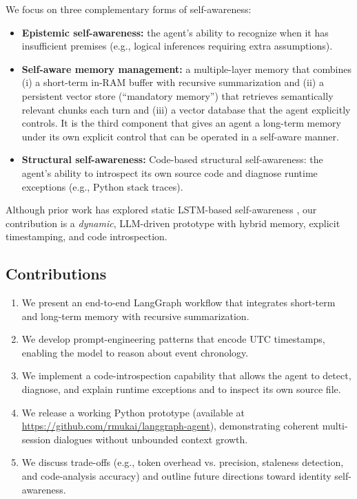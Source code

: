 \documentclass[11pt]{article}
\begin{document}
We focus on three complementary forms of self-awareness:
\begin{itemize}[leftmargin=*]
  \item \textbf{Epistemic self-awareness:} the agent’s ability to recognize when it has insufficient premises (e.g., logical inferences requiring extra assumptions).
  \item \textbf{Self-aware memory management:} a multiple-layer memory that combines (i) a short-term in-RAM buffer with recursive summarization and (ii) a persistent vector store (“mandatory memory”) that retrieves semantically relevant chunks each turn and (iii) a vector database that the agent explicitly controls.  It is the third component that gives an agent a long-term memory under its own explicit control that can be operated in a self-aware manner.
  \item \textbf{Structural self-awareness:}  
 {Code-based structural self-awareness:} the agent’s ability to introspect its own source code and diagnose runtime exceptions (e.g., Python stack traces).
\end{itemize}

Although prior work has explored static LSTM-based self-awareness \cite{Mukai2020}, our contribution is a \emph{dynamic}, LLM-driven prototype with hybrid memory, explicit timestamping, and code introspection.

\subsection{Contributions}
\begin{enumerate}[leftmargin=*]
  \item We present an end-to-end LangGraph workflow that integrates short-term and long-term memory with recursive summarization.
  \item We develop prompt-engineering patterns that encode UTC timestamps, enabling the model to reason about event chronology.
  \item We implement a code-introspection capability that allows the agent to detect, diagnose, and explain runtime exceptions and to inspect its own source file.
  \item We release a working Python prototype (available at \url{https://github.com/rmukai/langgraph-agent}), demonstrating coherent multi-session dialogues without unbounded context growth.
  \item We discuss trade-offs (e.g., token overhead vs. precision, staleness detection, and code-analysis accuracy) and outline future directions toward identity self-awareness.
\end{enumerate}
\end{document}
